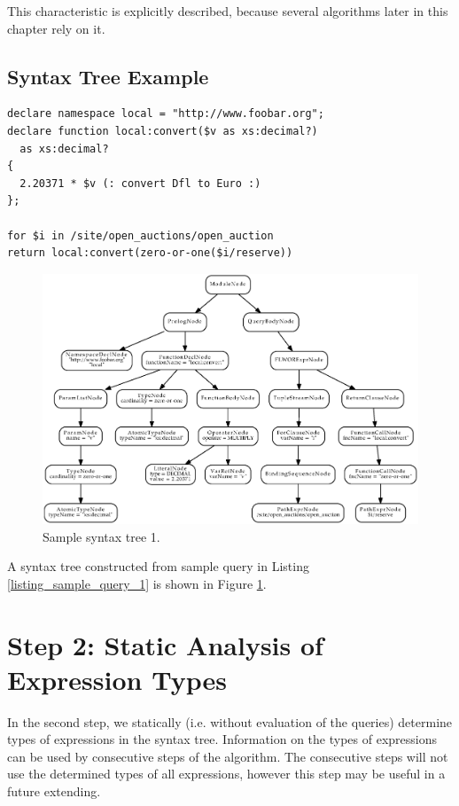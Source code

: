 This characteristic is explicitly described, because several algorithms later in this chapter rely on it.


\subsection{Syntax Tree Example}

\begin{lstlisting}[float, caption=Sample query 1., frame=single, label=listing_sample_query_1]
declare namespace local = "http://www.foobar.org";
declare function local:convert($v as xs:decimal?)
  as xs:decimal?
{
  2.20371 * $v (: convert Dfl to Euro :)
};

for $i in /site/open_auctions/open_auction
return local:convert(zero-or-one($i/reserve))
\end{lstlisting}

\begin{figure}
\label{FIG_syntax_tree_1}
\caption{Sample syntax tree 1.}
\includegraphics[scale=0.6]{syntax_tree_1.eps}
\end{figure}

A syntax tree constructed from sample query in Listing \ref{listing_sample_query_1} is shown in Figure \ref{FIG_syntax_tree_1}.

\section{Step 2: Static Analysis of Expression Types}
In the second step, we statically (i.e. without evaluation of the queries) determine types of expressions in the syntax tree. Information on the types of expressions can be used by consecutive steps of the algorithm. The consecutive steps will not use the determined types of all expressions, however this step may be useful in a future extending.

